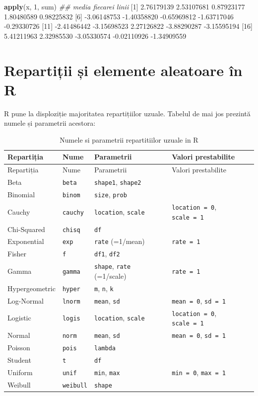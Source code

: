 \documentclass[]{article}
\newenvironment{Shaded}{\begin{snugshade}}{\end{snugshade}}
\newcommand{\CommentTok}[1]{\textcolor[rgb]{0.56,0.35,0.01}{\textit{#1}}}
\newcommand{\DecValTok}[1]{\textcolor[rgb]{0.00,0.00,0.81}{#1}}
\newcommand{\FloatTok}[1]{\textcolor[rgb]{0.00,0.00,0.81}{#1}}
\newcommand{\KeywordTok}[1]{\textcolor[rgb]{0.13,0.29,0.53}{\textbf{#1}}}
\newcommand{\NormalTok}[1]{#1}
\begin{document}
\begin{Shaded}
\begin{Highlighting}[]
\KeywordTok{apply}\NormalTok{(x, }\DecValTok{1}\NormalTok{, sum)   }\CommentTok{## media fiecarei linii}
\NormalTok{ [}\DecValTok{1}\NormalTok{]  }\FloatTok{2.76179139}  \FloatTok{2.53107681}  \FloatTok{0.87923177}  \FloatTok{1.80480589}  \FloatTok{0.98225832}
\NormalTok{ [}\DecValTok{6}\NormalTok{] }\FloatTok{-3.06148753} \FloatTok{-1.40358820} \FloatTok{-0.65969812} \FloatTok{-1.63717046} \FloatTok{-0.29330726}
\NormalTok{[}\DecValTok{11}\NormalTok{] }\FloatTok{-2.41486442} \FloatTok{-3.15698523}  \FloatTok{2.27126822} \FloatTok{-3.88290287} \FloatTok{-3.15595194}
\NormalTok{[}\DecValTok{16}\NormalTok{]  }\FloatTok{5.41211963}  \FloatTok{2.32985530} \FloatTok{-3.05330574} \FloatTok{-0.02110926} \FloatTok{-1.34909559}
\end{Highlighting}
\end{Shaded}

\hypertarget{repartiux21bii-ux219i-elemente-aleatoare-uxeen-r}{%
\section{Repartiții și elemente aleatoare în
R}\label{repartiux21bii-ux219i-elemente-aleatoare-uxeen-r}}

R pune la disploziție majoritatea repartițiilor uzuale. Tabelul de mai
jos prezintă numele și parametrii acestora:

\begin{longtable}[]{@{}llll@{}}
\caption{Numele si parametrii repartitiilor uzuale in R}\tabularnewline
\toprule
Repartiția & Nume & Parametrii & Valori prestabilite\tabularnewline
\midrule
\endfirsthead
\toprule
Repartiția & Nume & Parametrii & Valori prestabilite\tabularnewline
\midrule
\endhead
Beta & \texttt{beta} & \texttt{shape1}, \texttt{shape2} &\tabularnewline
Binomial & \texttt{binom} & \texttt{size}, \texttt{prob}
&\tabularnewline
Cauchy & \texttt{cauchy} & \texttt{location}, \texttt{scale} &
\texttt{location\ =\ 0}, \texttt{scale\ =\ 1}\tabularnewline
Chi-Squared & \texttt{chisq} & \texttt{df} &\tabularnewline
Exponential & \texttt{exp} & \texttt{rate} (=1/mean) &
\texttt{rate\ =\ 1}\tabularnewline
Fisher & \texttt{f} & \texttt{df1}, \texttt{df2} &\tabularnewline
Gamma & \texttt{gamma} & \texttt{shape}, \texttt{rate} (=1/scale) &
\texttt{rate\ =\ 1}\tabularnewline
Hypergeometric & \texttt{hyper} & \texttt{m}, \texttt{n}, \texttt{k}
&\tabularnewline
Log-Normal & \texttt{lnorm} & \texttt{mean}, \texttt{sd} &
\texttt{mean\ =\ 0}, \texttt{sd\ =\ 1}\tabularnewline
Logistic & \texttt{logis} & \texttt{location}, \texttt{scale} &
\texttt{location\ =\ 0}, \texttt{scale\ =\ 1}\tabularnewline
Normal & \texttt{norm} & \texttt{mean}, \texttt{sd} &
\texttt{mean\ =\ 0}, \texttt{sd\ =\ 1}\tabularnewline
Poisson & \texttt{pois} & \texttt{lambda} &\tabularnewline
Student & \texttt{t} & \texttt{df} &\tabularnewline
Uniform & \texttt{unif} & \texttt{min}, \texttt{max} &
\texttt{min\ =\ 0}, \texttt{max\ =\ 1}\tabularnewline
Weibull & \texttt{weibull} & \texttt{shape} &\tabularnewline
\bottomrule
\end{longtable}
\end{document}
